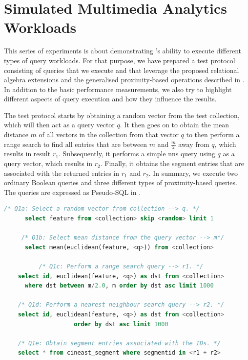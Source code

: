 \section{Simulated Multimedia Analytics Workloads}
\label{section:evaluation_analytics}

This series of experiments is about demonstrating \cottontail{}'s ability to execute different types of query workloads. For that purpose, we have prepared a test protocol consisting of queries that we execute and that leverage the proposed relational algebra extensions and the generalised proximity-based operations described in . In addition to the basic performance measurements, we also try to highlight different aspects of query execution and how they influence the results.

The test protocol starts by obtaining a random vector from the test collection, which will then act as a query vector $q$. It then goes on to obtain the mean distance $m$ of all vectors in the collection from that vector $q$ to then perform a range search to find all entries that are between $m$ and $\frac{m}{2}$ away from $q$, which results in result $r_1{}$. Subsequently, it performs a simple \acrshort{nns} query using $q$ as a query vector, which results in $r_2$. Finally, it obtains the segment entries that are associated with the returned entries in $r_1$ and $r_2$. In summary, we execute two ordinary Boolean queries and three different types of proximity-based queries. The queries are expressed as Pseudo-SQL in .

\begin{lstlisting}[language=SQL, caption={Pseudo-SQL of the queries executed for the analytics workload.}, label=listing:analytics_queries, numbers=none]
      /* Q1a: Select a random vector from collection --> q. */
      select feature from <collection> skip <random> limit 1
    
     /* Q1b: Select mean distance from the query vector --> m*/
      select mean(euclidean(feature, <q>)) from <collection> 

          /* Q1c: Perform a range search query --> r1. */
    select id, euclidean(feature, <q>) as dst from <collection> 
      where dst between m/2.0, m order by dst asc limit 1000

    /* Q1d: Perform a nearest neighbour search query --> r2. */
    select id, euclidean(feature, <q>) as dst from <collection> 
                    order by dst asc limit 1000

    /* Q1e: Obtain segment entries associated with the IDs. */
    select * from cineast_segment where segmentid in <r1 + r2>
\end{lstlisting}

